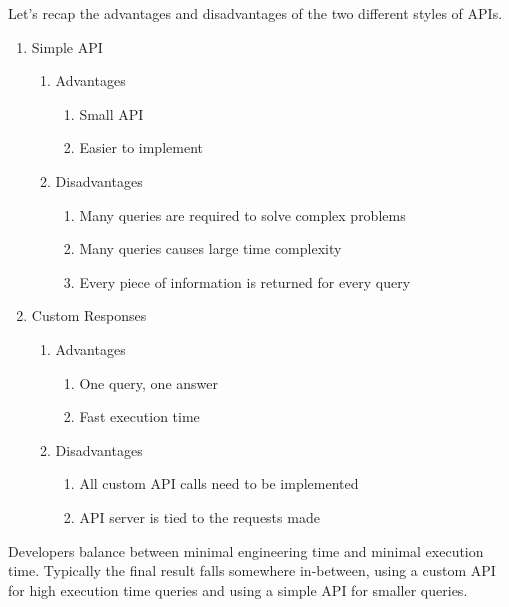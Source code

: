 \documentclass[stat,dissertation]{puthesis}\usepackage[]{graphicx}\usepackage{xcolor}
\begin{document}
Let's recap the advantages and disadvantages of the two different styles of APIs.

\begin{enumerate}
  \item Simple API
    \begin{enumerate}
      \item Advantages
        \begin{enumerate}
          \item Small API
          \item Easier to implement
        \end{enumerate}
      \item Disadvantages
      \begin{enumerate}
        \item Many queries are required to solve complex problems
        \item Many queries causes large time complexity
        \item Every piece of information is returned for every query
      \end{enumerate}
    \end{enumerate}
  \item Custom Responses
    \begin{enumerate}
      \item Advantages
        \begin{enumerate}
          \item One query, one answer
          \item Fast execution time
        \end{enumerate}
      \item Disadvantages
        \begin{enumerate}
          \item All custom API calls need to be implemented
          \item API server is tied to the requests made
        \end{enumerate}
    \end{enumerate}
\end{enumerate}


Developers balance between minimal engineering time and minimal execution time.  Typically the final result falls somewhere in-between, using a custom API for high execution time queries and using a simple API for smaller queries.
\end{document}

